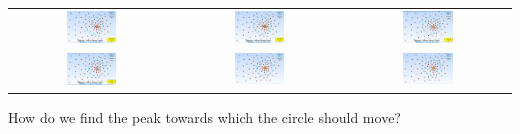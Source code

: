 \documentclass[a4paper]{article}
\begin{document}
\begin{longtable}{ccc}
  \includegraphics[width=0.32\textwidth] {img/mean_shift/ROI_densest_09.PNG} &
  \includegraphics[width=0.32\textwidth] {img/mean_shift/ROI_densest_11.PNG} &
  \includegraphics[width=0.32\textwidth] {img/mean_shift/ROI_densest_12.PNG} \\
  \includegraphics[width=0.32\textwidth] {img/mean_shift/ROI_densest_13.PNG} &
  \includegraphics[width=0.32\textwidth] {img/mean_shift/ROI_densest_15.PNG} &
  \includegraphics[width=0.32\textwidth] {img/mean_shift/ROI_densest_15.PNG}
\end{longtable}

\faQuestionCircle \; How do we find the peak towards which the circle should move?
\end{document}
